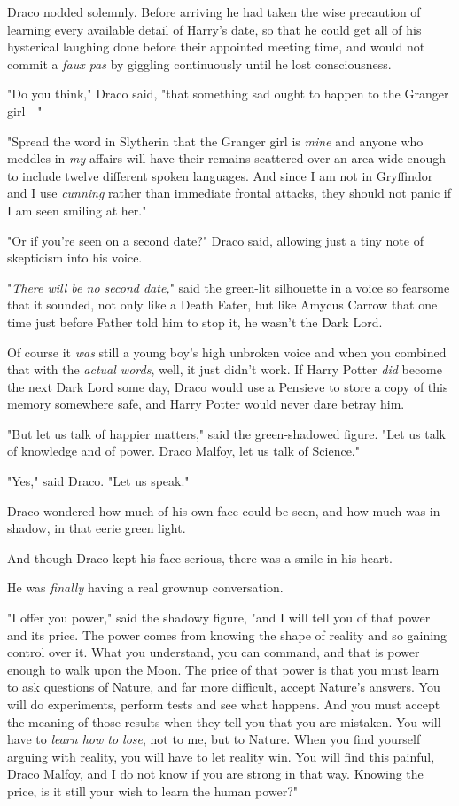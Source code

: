 Draco nodded solemnly. Before arriving he had taken the wise precaution of
learning every available detail of Harry's date, so that he could get all of
his hysterical laughing done before their appointed meeting time, and would not
commit a \emph{faux pas} by giggling continuously until he lost consciousness.

"Do you think," Draco said, "that something sad ought to happen to the Granger
girl---"

"Spread the word in Slytherin that the Granger girl is \emph{mine} and anyone
who meddles in \emph{my} affairs will have their remains scattered over an area
wide enough to include twelve different spoken languages. And since I am not in
Gryffindor and I use \emph{cunning} rather than immediate frontal attacks, they
should not panic if I am seen smiling at her."

"Or if you're seen on a second date?" Draco said, allowing just a tiny note of
skepticism into his voice.

"\emph{There will be no second date,}" said the green-lit silhouette in a voice
so fearsome that it sounded, not only like a Death Eater, but like Amycus
Carrow that one time just before Father told him to stop it, he wasn't the Dark
Lord.

Of course it \emph{was} still a young boy's high unbroken voice and when you
combined that with the \emph{actual words}, well, it just didn't work. If Harry
Potter \emph{did} become the next Dark Lord some day, Draco would use a Pensieve
to store a copy of this memory somewhere safe, and Harry Potter would never
dare betray him.

"But let us talk of happier matters," said the green-shadowed figure. "Let us
talk of knowledge and of power. Draco Malfoy, let us talk of Science."

"Yes," said Draco. "Let us speak."

Draco wondered how much of his own face could be seen, and how much was in
shadow, in that eerie green light.

And though Draco kept his face serious, there was a smile in his heart.

He was \emph{finally} having a real grownup conversation.

"I offer you power," said the shadowy figure, "and I will tell you of that
power and its price. The power comes from knowing the shape of reality and so
gaining control over it. What you understand, you can command, and that is
power enough to walk upon the Moon. The price of that power is that you must
learn to ask questions of Nature, and far more difficult, accept Nature's
answers. You will do experiments, perform tests and see what happens. And you
must accept the meaning of those results when they tell you that you are
mistaken. You will have to \emph{learn how to lose}, not to me, but to Nature.
When you find yourself arguing with reality, you will have to let reality win.
You will find this painful, Draco Malfoy, and I do not know if you are strong
in that way. Knowing the price, is it still your wish to learn the human power?"

